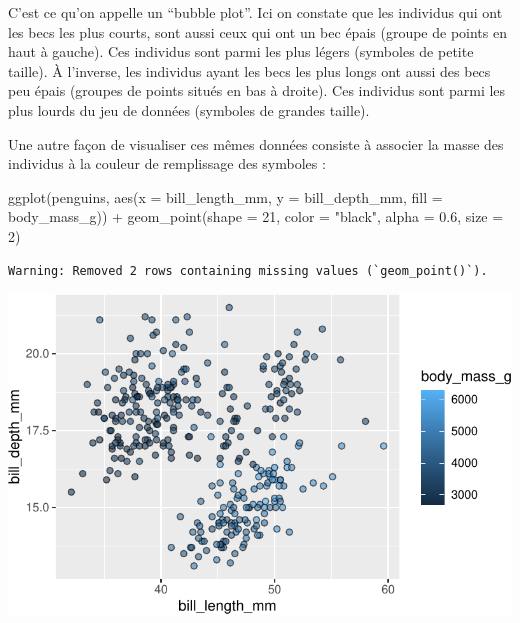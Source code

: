 \documentclass[
  a4paper,
  DIV=11,
  numbers=noendperiod,
  oneside]{scrreprt}
\newenvironment{Shaded}{}{}
\newcommand{\AttributeTok}[1]{\textcolor[rgb]{0.84,0.23,0.29}{#1}}
\newcommand{\DecValTok}[1]{\textcolor[rgb]{0.00,0.36,0.77}{#1}}
\newcommand{\FloatTok}[1]{\textcolor[rgb]{0.00,0.36,0.77}{#1}}
\newcommand{\FunctionTok}[1]{\textcolor[rgb]{0.44,0.26,0.76}{#1}}
\newcommand{\NormalTok}[1]{\textcolor[rgb]{0.14,0.16,0.18}{#1}}
\newcommand{\SpecialCharTok}[1]{\textcolor[rgb]{0.00,0.36,0.77}{#1}}
\newcommand{\StringTok}[1]{\textcolor[rgb]{0.01,0.18,0.38}{#1}}
\begin{document}
C'est ce qu'on appelle un ``bubble plot''. Ici on constate que les
individus qui ont les becs les plus courts, sont aussi ceux qui ont un
bec épais (groupe de points en haut à gauche). Ces individus sont parmi
les plus légers (symboles de petite taille). À l'inverse, les individus
ayant les becs les plus longs ont aussi des becs peu épais (groupes de
points situés en bas à droite). Ces individus sont parmi les plus lourds
du jeu de données (symboles de grandes taille).

Une autre façon de visualiser ces mêmes données consiste à associer la
masse des individus à la couleur de remplissage des symboles :

\begin{Shaded}
\begin{Highlighting}[]
\FunctionTok{ggplot}\NormalTok{(penguins, }\FunctionTok{aes}\NormalTok{(}\AttributeTok{x =}\NormalTok{ bill\_length\_mm, }\AttributeTok{y =}\NormalTok{ bill\_depth\_mm,}
                     \AttributeTok{fill =}\NormalTok{ body\_mass\_g)) }\SpecialCharTok{+}
  \FunctionTok{geom\_point}\NormalTok{(}\AttributeTok{shape =} \DecValTok{21}\NormalTok{, }\AttributeTok{color =} \StringTok{"black"}\NormalTok{, }\AttributeTok{alpha =} \FloatTok{0.6}\NormalTok{, }\AttributeTok{size =} \DecValTok{2}\NormalTok{)}
\end{Highlighting}
\end{Shaded}

\begin{verbatim}
Warning: Removed 2 rows containing missing values (`geom_point()`).
\end{verbatim}

\includegraphics{03-visualization_files/figure-pdf/unnamed-chunk-76-1.pdf}
\end{document}
